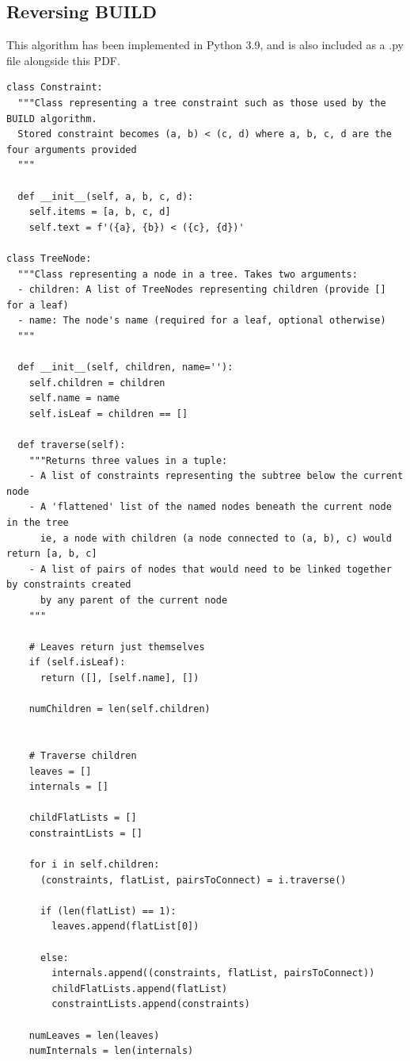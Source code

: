 \documentclass[11pt]{article} %
\begin{document}
\begin{landscape}
\subsection{Reversing BUILD}
This algorithm has been implemented in Python 3.9, and is also included as a .py file alongside this PDF.
\begin{lstlisting}
class Constraint:
  """Class representing a tree constraint such as those used by the BUILD algorithm.
  Stored constraint becomes (a, b) < (c, d) where a, b, c, d are the four arguments provided
  """

  def __init__(self, a, b, c, d):
    self.items = [a, b, c, d]
    self.text = f'({a}, {b}) < ({c}, {d})'

class TreeNode:
  """Class representing a node in a tree. Takes two arguments:
  - children: A list of TreeNodes representing children (provide [] for a leaf)
  - name: The node's name (required for a leaf, optional otherwise)
  """

  def __init__(self, children, name=''):
    self.children = children
    self.name = name
    self.isLeaf = children == []
  
  def traverse(self):
    """Returns three values in a tuple:
    - A list of constraints representing the subtree below the current node
    - A 'flattened' list of the named nodes beneath the current node in the tree
      ie, a node with children (a node connected to (a, b), c) would return [a, b, c]
    - A list of pairs of nodes that would need to be linked together by constraints created
      by any parent of the current node
    """

    # Leaves return just themselves
    if (self.isLeaf):
      return ([], [self.name], [])
    
    numChildren = len(self.children)


    # Traverse children
    leaves = []
    internals = []

    childFlatLists = []
    constraintLists = []

    for i in self.children:
      (constraints, flatList, pairsToConnect) = i.traverse()

      if (len(flatList) == 1):
        leaves.append(flatList[0])
      
      else:
        internals.append((constraints, flatList, pairsToConnect))
        childFlatLists.append(flatList)
        constraintLists.append(constraints)

    numLeaves = len(leaves)
    numInternals = len(internals)



\end{lstlisting}
\end{landscape}
\end{document}
